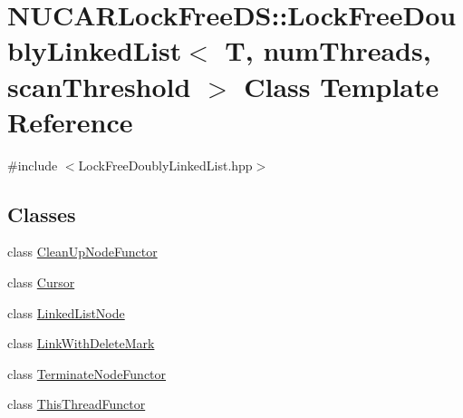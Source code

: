 \hypertarget{class_n_u_c_a_r_lock_free_d_s_1_1_lock_free_doubly_linked_list}{}\section{N\+U\+C\+A\+R\+Lock\+Free\+DS\+:\+:Lock\+Free\+Doubly\+Linked\+List$<$ T, num\+Threads, scan\+Threshold $>$ Class Template Reference}
\label{class_n_u_c_a_r_lock_free_d_s_1_1_lock_free_doubly_linked_list}


{\ttfamily \#include $<$Lock\+Free\+Doubly\+Linked\+List.\+hpp$>$}

\subsection*{Classes}
\begin{DoxyCompactItemize}
\item 
class \mbox{\hyperlink{class_n_u_c_a_r_lock_free_d_s_1_1_lock_free_doubly_linked_list_1_1_clean_up_node_functor}{Clean\+Up\+Node\+Functor}}
\item 
class \mbox{\hyperlink{class_n_u_c_a_r_lock_free_d_s_1_1_lock_free_doubly_linked_list_1_1_cursor}{Cursor}}
\item 
class \mbox{\hyperlink{class_n_u_c_a_r_lock_free_d_s_1_1_lock_free_doubly_linked_list_1_1_linked_list_node}{Linked\+List\+Node}}
\item 
class \mbox{\hyperlink{class_n_u_c_a_r_lock_free_d_s_1_1_lock_free_doubly_linked_list_1_1_link_with_delete_mark}{Link\+With\+Delete\+Mark}}
\item 
class \mbox{\hyperlink{class_n_u_c_a_r_lock_free_d_s_1_1_lock_free_doubly_linked_list_1_1_terminate_node_functor}{Terminate\+Node\+Functor}}
\item 
class \mbox{\hyperlink{class_n_u_c_a_r_lock_free_d_s_1_1_lock_free_doubly_linked_list_1_1_this_thread_functor}{This\+Thread\+Functor}}
\end{DoxyCompactItemize}
